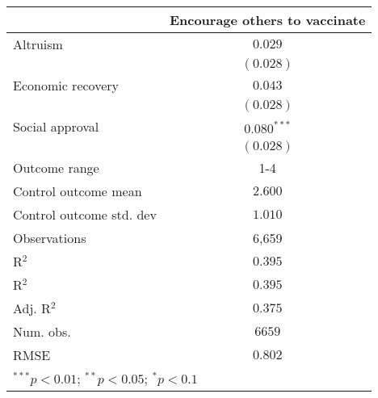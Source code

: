 
\begin{table}
\begin{center}
\begin{tabular}{l c}
\hline
 & Encourage others to vaccinate \\
\hline
Altruism                 & $0.029$       \\
                         & $(0.028)$     \\
Economic recovery        & $0.043$       \\
                         & $(0.028)$     \\
Social approval          & $0.080^{***}$ \\
                         & $(0.028)$     \\
\hline
Outcome range            & 1-4           \\
Control outcome mean     & $2.600$       \\
Control outcome std. dev & $1.010$       \\
Observations             & 6,659         \\
R$^{2}$                  & $0.395$       \\
R$^2$                    & $0.395$       \\
Adj. R$^2$               & $0.375$       \\
Num. obs.                & $6659$        \\
RMSE                     & $0.802$       \\
\hline
\multicolumn{2}{l}{\scriptsize{$^{***}p<0.01$; $^{**}p<0.05$; $^{*}p<0.1$}}
\end{tabular}
\caption{}
\label{table:Tables and Figures/SI_table23_motiv_encourage1-4_pooled}
\end{center}
\end{table}

